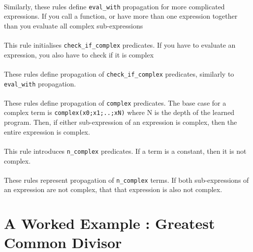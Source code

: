 
\mbox{} \\
Similarly, these rules define \lstinline{eval_with} propagation for more complicated expressions. If you call a function, or have more than one expression together than you evaluate all complex sub-expressions \\ %


\mbox{} \\
This rule initialises \lstinline{check_if_complex} predicates. If you have to evaluate an expression, you also have to check if it is complex \\%


\mbox{} \\
These rules define propagation of \lstinline{check_if_complex} predicates, similarly to \lstinline{eval_with} propagation. \\


\mbox{} \\
These rules define propagation of \lstinline{complex} predicates. The base case for a complex term is \lstinline{complex(x0;x1;..;xN)} where N is the depth of the learned program. Then, if either sub-expression of an expression is complex, then the entire expression is complex. \\


\mbox{} \\
This rule introduces \lstinline{n_complex} predicates. If a term is a constant, then it is not complex. \\ %


\mbox{} \\
These rules represent propagation of \lstinline{n_complex} terms. If both sub-expressions of an expression are not complex, that that expression is also not complex. \\ %

\pagebreak

\section{A Worked Example : Greatest Common Divisor}

